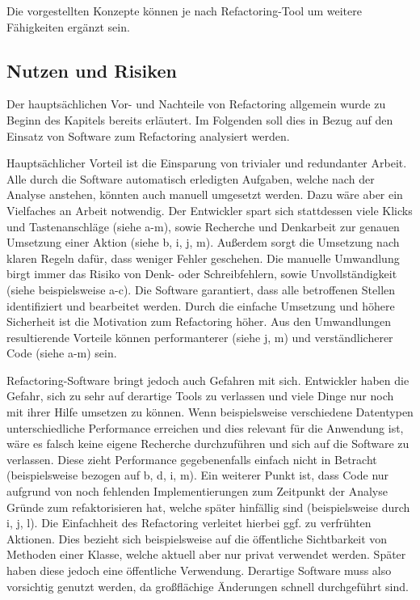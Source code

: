 Die vorgestellten Konzepte können je nach Refactoring-Tool um weitere Fähigkeiten ergänzt sein. 

\subsection{Nutzen und Risiken}
\label{subsec:refactor_risks}
Der hauptsächlichen Vor- und Nachteile von Refactoring allgemein wurde zu Beginn des Kapitels bereits erläutert. Im Folgenden soll dies in Bezug auf den Einsatz von Software zum Refactoring analysiert werden.

Hauptsächlicher Vorteil ist die Einsparung von trivialer und redundanter Arbeit. Alle durch die Software automatisch erledigten Aufgaben, welche nach der Analyse anstehen, könnten auch manuell umgesetzt werden. Dazu wäre aber ein Vielfaches an Arbeit notwendig. Der Entwickler spart sich stattdessen viele Klicks und Tastenanschläge (siehe a-m), sowie Recherche und Denkarbeit zur genauen Umsetzung einer Aktion (siehe b, i, j, m). Außerdem sorgt die Umsetzung nach klaren Regeln dafür, dass weniger Fehler geschehen. Die manuelle Umwandlung birgt immer das Risiko von Denk- oder Schreibfehlern, sowie Unvollständigkeit (siehe beispielsweise a-c). Die Software garantiert, dass alle betroffenen Stellen identifiziert und bearbeitet werden. Durch die einfache Umsetzung und höhere Sicherheit ist die Motivation zum Refactoring höher. Aus den Umwandlungen resultierende Vorteile können performanterer (siehe j, m) und verständlicherer Code (siehe a-m) sein.

Refactoring-Software bringt jedoch auch Gefahren mit sich. Entwickler haben die Gefahr, sich zu sehr auf derartige Tools zu verlassen und viele Dinge nur noch mit ihrer Hilfe umsetzen zu können. Wenn beispielsweise verschiedene Datentypen unterschiedliche Performance erreichen und dies relevant für die Anwendung ist, wäre es falsch keine eigene Recherche durchzuführen und sich auf die Software zu verlassen. Diese zieht Performance gegebenenfalls einfach nicht in Betracht (beispielsweise bezogen auf b, d, i, m). Ein weiterer Punkt ist, dass Code nur aufgrund von noch fehlenden Implementierungen zum Zeitpunkt der Analyse Gründe zum refaktorisieren hat, welche später hinfällig sind (beispielsweise durch i, j, l). Die Einfachheit des Refactoring verleitet hierbei ggf. zu verfrühten Aktionen. Dies bezieht sich beispielsweise auf die öffentliche Sichtbarkeit von Methoden einer Klasse, welche aktuell aber nur privat verwendet werden. Später haben diese jedoch eine öffentliche Verwendung. Derartige Software muss also vorsichtig genutzt werden, da großflächige Änderungen schnell durchgeführt sind.

